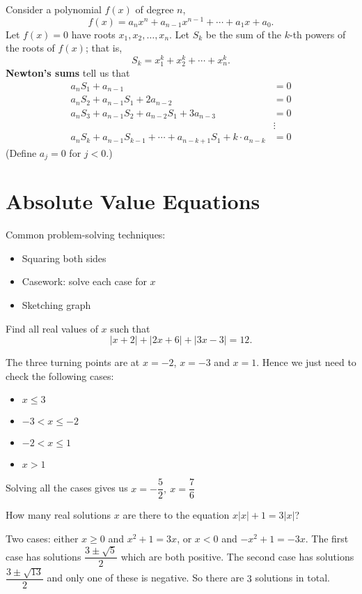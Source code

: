 Consider a polynomial $f(x)$ of degree $n$,
\[f(x) = a_nx^n + a_{n-1}x^{n-1} + \cdots + a_1x + a_0.\]
Let $f(x)=0$ have roots $x_1,x_2,\ldots,x_n$. Let $S_k$ be the sum of the $k$-th powers of the roots of $f(x)$; that is,
\[S_k = x_1^k + x_2^k + \cdots + x_n^k.\]
\textbf{Newton's sums} tell us that
\begin{align*}
a_nS_1 + a_{n-1}&=0\\
a_nS_2 + a_{n-1}S_1 + 2a_{n-2}&=0\\
a_nS_3 + a_{n-1}S_2 + a_{n-2}S_1 + 3a_{n-3}&=0\\
&\vdots\\
a_nS_k+a_{n-1}S_{k-1}+\cdots+a_{n-k+1}S_1+k\cdot a_{n-k}&=0
\end{align*}
(Define $a_j = 0$ for $j<0$.)
\pagebreak

\section{Absolute Value Equations}
Common problem-solving techniques:
\begin{itemize}
    \item Squaring both sides
    \item Casework: solve each case for $x$
    \item Sketching graph
\end{itemize}

\begin{exercise}
Find all real values of $x$ such that \[ |x+2|+|2x+6|+|3x-3|=12. \]
\end{exercise} 

\begin{solution}
The three turning points are at $x=-2$, $x=-3$ and $x=1$. Hence we just need to check the following cases:
\begin{itemize}
\item $x\le3$
\item $-3<x\le-2$
\item $-2<x\le1$
\item $x>1$
\end{itemize}
Solving all the cases gives us $\boxed{x=-\dfrac{5}{2},\:x=\dfrac{7}{6}}$
\end{solution}

\begin{exercise}
How many real solutions $x$ are there to the equation $x|x|+1=3|x|$?
\end{exercise}

\begin{solution}
Two cases: either $x \ge 0$ and $x^2+1=3x$, or $x < 0$ and $-x^2+1=-3x$. The first case has solutions $\dfrac{3\pm\sqrt{5}}{2}$ which are both positive. The second case has solutions $\dfrac{3\pm\sqrt{13}}{2}$ and only one of these is negative. So there are $\boxed{3}$ solutions in total.
\end{solution}
\pagebreak

